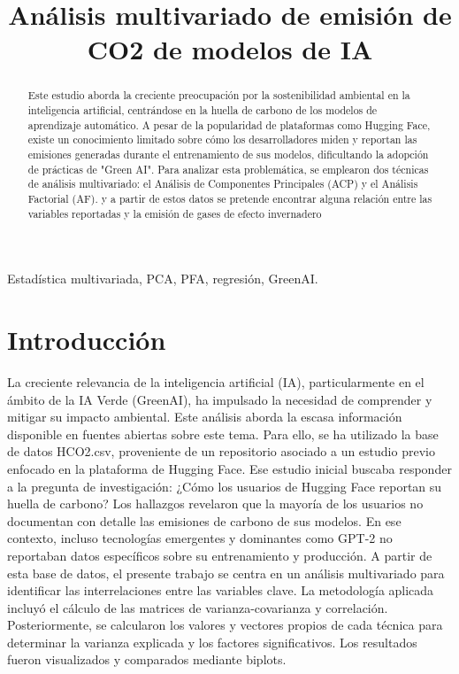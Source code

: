 \documentclass[journal]{IEEEtran}
\title{Análisis multivariado de emisión de CO2 de modelos de IA}
\author{
	\IEEEauthorblockN{Juan Felipe Gallo Rendón\IEEEauthorrefmark{1}}
	\IEEEauthorblockA{\textit{Facultad de Ingeniería} \\
		\textit{Universidad de Antioquia}\\
		Medellín, Colombia}
}
\begin{document}
	\maketitle
	
	\begin{abstract}
		Este estudio aborda la creciente preocupación por la sostenibilidad ambiental en la inteligencia artificial, centrándose en la huella de carbono de los modelos de aprendizaje automático. A pesar de la popularidad de plataformas como Hugging Face, existe un conocimiento limitado sobre cómo los desarrolladores miden y reportan las emisiones generadas durante el entrenamiento de sus modelos, dificultando la adopción de prácticas de "Green AI". Para analizar esta problemática, se emplearon dos técnicas de análisis multivariado: el Análisis de Componentes Principales (ACP) y el Análisis Factorial (AF). y a  partir de estos datos se pretende encontrar alguna relación entre las variables reportadas y la emisión de gases de efecto invernadero
	\end{abstract}
	
	\begin{IEEEkeywords}
		Estadística multivariada, PCA, PFA, regresión, GreenAI.
	\end{IEEEkeywords}
	
	
	\section{Introducción}
	\label{sec:introduction}
	La creciente relevancia de la inteligencia artificial (IA), particularmente en el ámbito de la IA Verde (GreenAI)\cite{green_ai_ust}, ha impulsado la necesidad de comprender y mitigar su impacto ambiental. Este análisis aborda la escasa información disponible en fuentes abiertas sobre este tema. Para ello, se ha utilizado la base de datos HCO2.csv, proveniente de un repositorio asociado a un estudio previo enfocado en la plataforma de Hugging Face\cite{exploring_carbon_footprint}. Ese estudio inicial buscaba responder a la pregunta de investigación: ¿Cómo los usuarios de Hugging Face reportan su huella de carbono? Los hallazgos revelaron que la mayoría de los usuarios no documentan con detalle las emisiones de carbono de sus modelos. En ese contexto, incluso tecnologías emergentes y dominantes como GPT-2 no reportaban datos específicos sobre su entrenamiento y producción.
	A partir de esta base de datos, el presente trabajo se centra en un análisis multivariado para identificar las interrelaciones entre las variables clave. La metodología aplicada incluyó el cálculo de las matrices de varianza-covarianza y correlación. Posteriormente, se calcularon los valores y vectores propios de cada técnica para determinar la varianza explicada y los factores significativos. Los resultados fueron visualizados y comparados mediante biplots.
	
\end{document}
